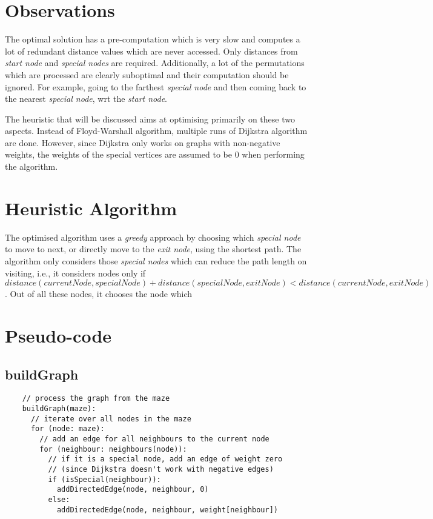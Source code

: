 \documentclass[12pt]{report}
\begin{document}
\section{Observations}
The optimal solution has a pre-computation which is very slow and computes a lot of redundant distance values which are never accessed. Only distances from \textit{start node} and \textit{special nodes} are required. Additionally, a lot of the permutations which are processed are clearly suboptimal and their computation should be ignored. For example, going to the farthest \textit{special node} and then coming back to the nearest \textit{special node}, wrt the \textit{start node}.\par
The heuristic that will be discussed aims at optimising primarily on these two aspects. Instead of Floyd-Warshall algorithm, multiple runs of Dijkstra algorithm are done. However, since Dijkstra only works on graphs with non-negative weights, the weights of the special vertices are assumed to be $0$ when performing the algorithm.

\section{Heuristic Algorithm}
The optimised algorithm uses a \textit{greedy} approach by choosing which \textit{special node} to move to next, or directly move to the \textit{exit node}, using the shortest path. The algorithm only considers those \textit{special nodes} which can reduce the path length on visiting, i.e., it considers nodes only if ${distance}({currentNode}, {specialNode}) + {distance}({specialNode}, {exitNode}) < {distance}({currentNode}, {exitNode})$. Out of all these nodes, it chooses the node which %

\section{Pseudo-code}
\subsection{buildGraph}
\begin{tcolorbox}
\begin{verbatim}
    // process the graph from the maze
    buildGraph(maze):
      // iterate over all nodes in the maze
      for (node: maze):
        // add an edge for all neighbours to the current node
        for (neighbour: neighbours(node)):
          // if it is a special node, add an edge of weight zero
          // (since Dijkstra doesn't work with negative edges)
          if (isSpecial(neighbour)):
            addDirectedEdge(node, neighbour, 0)
          else:
            addDirectedEdge(node, neighbour, weight[neighbour])
\end{verbatim}
\end{tcolorbox}
\end{document}
